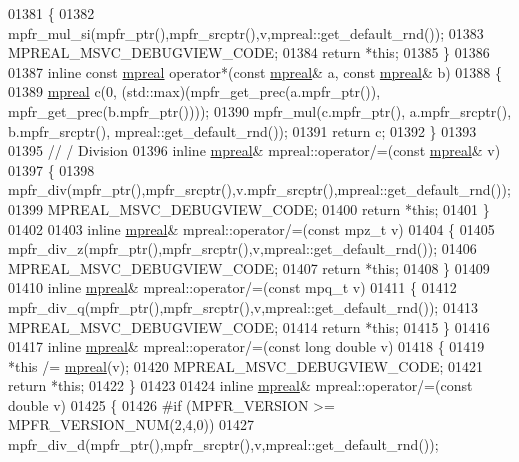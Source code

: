 \begin{DoxyCode}
01381 \{
01382     mpfr\_mul\_si(mpfr\_ptr(),mpfr\_srcptr(),v,mpreal::get\_default\_rnd());
01383     MPREAL\_MSVC\_DEBUGVIEW\_CODE;
01384     \textcolor{keywordflow}{return} *\textcolor{keyword}{this};
01385 \}
01386 
01387 \textcolor{keyword}{inline} \textcolor{keyword}{const} \hyperlink{classmpfr_1_1mpreal}{mpreal} operator*(\textcolor{keyword}{const} \hyperlink{classmpfr_1_1mpreal}{mpreal}& a, \textcolor{keyword}{const} \hyperlink{classmpfr_1_1mpreal}{mpreal}& b)
01388 \{
01389   \hyperlink{classmpfr_1_1mpreal}{mpreal} c(0, (std::max)(mpfr\_get\_prec(a.mpfr\_ptr()), mpfr\_get\_prec(b.mpfr\_ptr())));
01390   mpfr\_mul(c.mpfr\_ptr(), a.mpfr\_srcptr(), b.mpfr\_srcptr(), mpreal::get\_default\_rnd());
01391   \textcolor{keywordflow}{return} c;
01392 \}
01393 
01395 \textcolor{comment}{// / Division}
01396 \textcolor{keyword}{inline} \hyperlink{classmpfr_1_1mpreal}{mpreal}& mpreal::operator/=(\textcolor{keyword}{const} \hyperlink{classmpfr_1_1mpreal}{mpreal}& v)
01397 \{
01398     mpfr\_div(mpfr\_ptr(),mpfr\_srcptr(),v.mpfr\_srcptr(),mpreal::get\_default\_rnd());
01399     MPREAL\_MSVC\_DEBUGVIEW\_CODE;
01400     \textcolor{keywordflow}{return} *\textcolor{keyword}{this};
01401 \}
01402 
01403 \textcolor{keyword}{inline} \hyperlink{classmpfr_1_1mpreal}{mpreal}& mpreal::operator/=(\textcolor{keyword}{const} mpz\_t v)
01404 \{
01405     mpfr\_div\_z(mpfr\_ptr(),mpfr\_srcptr(),v,mpreal::get\_default\_rnd());
01406     MPREAL\_MSVC\_DEBUGVIEW\_CODE;
01407     \textcolor{keywordflow}{return} *\textcolor{keyword}{this};
01408 \}
01409 
01410 \textcolor{keyword}{inline} \hyperlink{classmpfr_1_1mpreal}{mpreal}& mpreal::operator/=(\textcolor{keyword}{const} mpq\_t v)
01411 \{
01412     mpfr\_div\_q(mpfr\_ptr(),mpfr\_srcptr(),v,mpreal::get\_default\_rnd());
01413     MPREAL\_MSVC\_DEBUGVIEW\_CODE;
01414     \textcolor{keywordflow}{return} *\textcolor{keyword}{this};
01415 \}
01416 
01417 \textcolor{keyword}{inline} \hyperlink{classmpfr_1_1mpreal}{mpreal}& mpreal::operator/=(\textcolor{keyword}{const} \textcolor{keywordtype}{long} \textcolor{keywordtype}{double} v)
01418 \{
01419     *\textcolor{keyword}{this} /= \hyperlink{classmpfr_1_1mpreal}{mpreal}(v);
01420     MPREAL\_MSVC\_DEBUGVIEW\_CODE;
01421     \textcolor{keywordflow}{return} *\textcolor{keyword}{this};
01422 \}
01423 
01424 \textcolor{keyword}{inline} \hyperlink{classmpfr_1_1mpreal}{mpreal}& mpreal::operator/=(\textcolor{keyword}{const} \textcolor{keywordtype}{double} v)
01425 \{
01426 \textcolor{preprocessor}{#if (MPFR\_VERSION >= MPFR\_VERSION\_NUM(2,4,0))}
01427     mpfr\_div\_d(mpfr\_ptr(),mpfr\_srcptr(),v,mpreal::get\_default\_rnd());

\end{DoxyCode}
